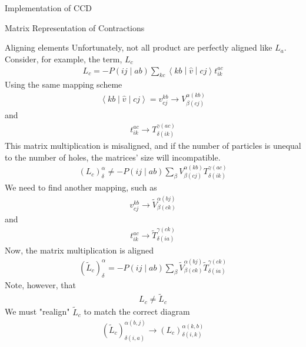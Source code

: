 \documentclass[twoside,english]{uiofysmaster}
\begin{document}
\begin{chapter}{Implementation of CCD}
\begin{section}{Matrix Representation of Contractions}
		\begin{subsection}{Aligning elements}	
			Unfortunately, not all product are perfectly aligned like $L_a$. Consider, for example, the term, $L_c$
			\begin{align}
				L_c = -P\left(ij\middle|ab\right) \sum_{kc} \left<kb\middle|\hat v\middle|cj\right>t_{ik}^{ac}
			\end{align}
			Using the same mapping scheme
			\begin{align}
				\left<kb\middle|\hat v\middle|cj\right> = v_{cj}^{kb} \rightarrow V_{\beta(cj)}^{\alpha(kb)}
			\end{align}
			and
			\begin{align}
				t_{ik}^{ac} \rightarrow T_{\delta(ik)}^{\gamma(ac)}
			\end{align}
			This matrix multiplication is misaligned, and if the number of particles is unequal to the number of holes, the matrices' size will incompatible. 
			\begin{align}
				(L_c)_ \delta^\alpha \neq -P\left(ij\middle|ab\right) \sum_ \beta V_{\beta(cj)}^{\alpha(kb)} T_{\delta(ik)}^{\gamma(ac)}
			\end{align}
			We need to find another mapping, such as
			\begin{align}
				v_{cj}^{kb} \rightarrow \tilde V_{\beta(ck)}^{\alpha(bj)}
			\end{align}
			and 
			\begin{align}
				t_{ik}^{ac} \rightarrow \tilde T_{\delta(ia)}^{\gamma(ck)}
			\end{align}
			Now, the matrix multiplication is aligned
			\begin{align}
				(\tilde L_c)_ \delta^\alpha = -P\left(ij\middle|ab\right) \sum_ \beta \tilde V_{\beta(ck)}^{\alpha(bj)} \tilde T_{\delta(ia)}^{\gamma(ck)}
			\end{align}
			Note, however, that 
			\begin{align}
				L_c \neq \tilde L_c
			\end{align}
			We must "realign" $\tilde L_c$ to match the correct diagram
			\begin{align}
				(\tilde L_c)_{\delta(i,a)}^{\alpha(b,j)} \rightarrow (L_c)_{\delta(i,k)}^{\alpha(k,b)}
			\end{align}


\end{subsection}
\end{section}
\end{chapter}
\end{document}
